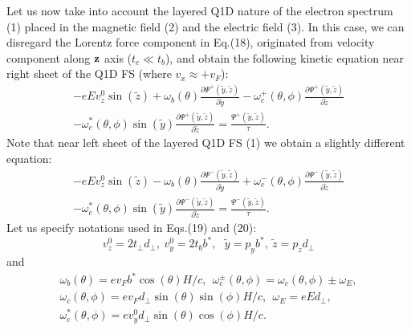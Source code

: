 \documentclass[prl,aps,showpacs,twocolumn,floatfix]{revtex4}
\begin{document}
Let us now take into account the layered Q1D nature of the
electron spectrum (1) placed in the magnetic field (2) and the
electric field (3). In this case, we can disregard the Lorentz
force component in Eq.(18), originated from velocity component
along ${\bf z}$ axis ($t_c \ll t_b$), and obtain the following
kinetic equation near right sheet of the Q1D FS (where $v_x
\approx + v_F$):
\begin{eqnarray}
-e E v^0_z \sin (\tilde z) + \omega_b (\theta) \frac{\partial
\Psi^+(\tilde y, \tilde z)}{\partial \tilde y} -
\omega^+_c(\theta,\phi) \frac{\partial \Psi^+(\tilde y, \tilde
z)}{\partial \tilde z}
\nonumber\\
- \omega^*_c(\theta,\phi) \sin(\tilde y) \frac{\partial
\Psi^+(\tilde y, \tilde z)}{\partial \tilde z}
 =  \frac{\Psi^+(\tilde y, \tilde z)}{\tau}.
\end{eqnarray}
Note that near left sheet of the layered Q1D FS (1) we obtain a
slightly different equation:
\begin{eqnarray}
-e E v^0_z \sin (\tilde z) - \omega_b (\theta) \frac{\partial
\Psi^-(\tilde y, \tilde z)}{\partial \tilde y} +
\omega^-_c(\theta,\phi) \frac{\partial \Psi^-(\tilde y, \tilde
z)}{\partial \tilde z}
\nonumber\\
- \omega^*_c(\theta,\phi) \sin(\tilde y) \frac{\partial
\Psi^-(\tilde y, \tilde z)}{\partial \tilde z}
 =  \frac{\Psi^-(\tilde y, \tilde z)}{\tau}.
\end{eqnarray}
Let us specify notations used in Eqs.(19) and (20):
\begin{equation}
v^0_z = 2 t_{\perp} d_{\perp} , \ v^0_y = 2 t_b b^*, \ \ \  \tilde
y = p_y b^*, \ \tilde z = p_z d_{\perp}
\end{equation}
and
\begin{eqnarray}
\omega_b (\theta)= e v_F b^* \cos (\theta)H/c, \ \
\omega^{\pm}_c(\theta,\phi)=\omega_c(\theta,\phi) \pm \omega_E,
\nonumber\\
\omega_c(\theta,\phi)=e v_F d_{\perp} \sin(\theta) \sin(\phi) H/c
, \ \ \omega_E=eEd_{\perp},
\nonumber\\
\omega^*_c(\theta,\phi) = e v^0_y d_{\perp} \sin(\theta)
\cos(\phi) H/c.
\end{eqnarray}
\end{document}
